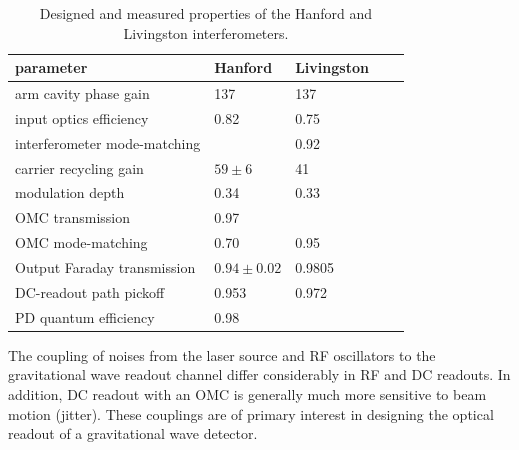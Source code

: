 \begin{table}
\centering
\begin{tabular}{l l l l l}
\hline 
\textbf{parameter}          &\textbf{Hanford}&\textbf{Livingston}  \\
\hline
arm cavity phase gain       & 137            & 137         \\
input optics efficiency     & 0.82           & 0.75        \\
interferometer mode-matching&                & 0.92        \\
carrier recycling gain      & $59\pm6$       & 41          \\
modulation depth            & 0.34           & 0.33        \\
OMC transmission            & 0.97           &             \\
OMC mode-matching           & 0.70           & 0.95        \\
Output Faraday transmission & $0.94\pm0.02$  & 0.9805      \\
DC-readout path pickoff     & 0.953          & 0.972       \\
PD quantum efficiency       & 0.98           &             \\
\hline
\end{tabular}
\caption{Designed and measured properties of the Hanford and Livingston interferometers.}
\label{tab:IFOproperties}
\end{table}



The coupling of noises from the laser source and RF oscillators to the
gravitational wave readout channel differ considerably in RF and DC
readouts.  In addition, DC readout with an OMC is generally much more
sensitive to beam motion (jitter).  These couplings are of primary
interest in designing the optical readout of a gravitational wave
detector.


